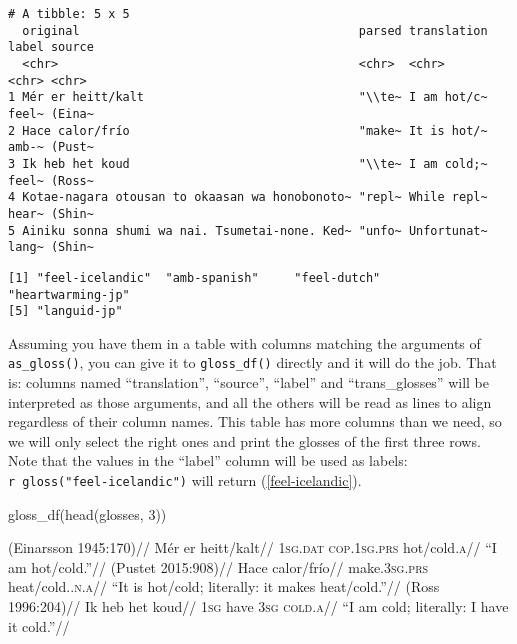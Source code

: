 \documentclass[
  letterpaper,
  DIV=11,
  numbers=noendperiod]{scrartcl}
\newenvironment{Shaded}{\begin{snugshade}}{\end{snugshade}}
\newcommand{\DecValTok}[1]{\textcolor[rgb]{0.68,0.00,0.00}{#1}}
\newcommand{\FunctionTok}[1]{\textcolor[rgb]{0.28,0.35,0.67}{#1}}
\newcommand{\NormalTok}[1]{\textcolor[rgb]{0.00,0.23,0.31}{#1}}
\newcommand{\SpecialCharTok}[1]{\textcolor[rgb]{0.37,0.37,0.37}{#1}}
\begin{document}
\begin{verbatim}
# A tibble: 5 x 5
  original                                       parsed translation label source
  <chr>                                          <chr>  <chr>       <chr> <chr> 
1 Mér er heitt/kalt                              "\\te~ I am hot/c~ feel~ (Eina~
2 Hace calor/frío                                "make~ It is hot/~ amb-~ (Pust~
3 Ik heb het koud                                "\\te~ I am cold;~ feel~ (Ross~
4 Kotae-nagara otousan to okaasan wa honobonoto~ "repl~ While repl~ hear~ (Shin~
5 Ainiku sonna shumi wa nai. Tsumetai-none. Ked~ "unfo~ Unfortunat~ lang~ (Shin~
\end{verbatim}

\begin{Shaded}
\end{Shaded}

\begin{verbatim}
[1] "feel-icelandic"  "amb-spanish"     "feel-dutch"      "heartwarming-jp"
[5] "languid-jp"     
\end{verbatim}

Assuming you have them in a table with columns matching the arguments of
\texttt{as\_gloss()}, you can give it to \texttt{gloss\_df()} directly
and it will do the job. That is: columns named ``translation'',
``source'', ``label'' and ``trans\_glosses'' will be interpreted as
those arguments, and all the others will be read as lines to align
regardless of their column names. This table has more columns than we
need, so we will only select the right ones and print the glosses of the
first three rows. Note that the values in the ``label'' column will be
used as labels:
\texttt{\textasciigrave{}r\ gloss("feel-icelandic")\textasciigrave{}}
will return (\ref{feel-icelandic}).

\begin{Shaded}
\begin{Highlighting}[]
\FunctionTok{gloss\_df}\NormalTok{(}\FunctionTok{head}\NormalTok{(glosses, }\DecValTok{3}\NormalTok{))}
\end{Highlighting}
\end{Shaded}

\ex\label{feel-icelandic}
\begingl \glpreamble (Einarsson 1945:170)// \gla Mér er heitt/kalt//
\glb \textsc{1sg.dat} \textsc{cop.1sg.prs} hot/cold.\textsc{a}//
\glft ``I am hot/cold.''// \endgl \xe  \ex\label{amb-spanish}
\begingl \glpreamble (Pustet 2015:908)// \gla Hace calor/frío//
\glb make.\textsc{3sg.prs} heat/cold.\textsc{.n.a}// \glft ``It is
hot/cold; literally: it makes heat/cold.''// \endgl \xe 
\ex\label{feel-dutch} \begingl \glpreamble (Ross 1996:204)// \gla Ik heb
het koud// \glb \textsc{1sg} have \textsc{3sg} \textsc{cold.a}//
\glft ``I am cold; literally: I have it cold.''// \endgl \xe 
\end{document}
